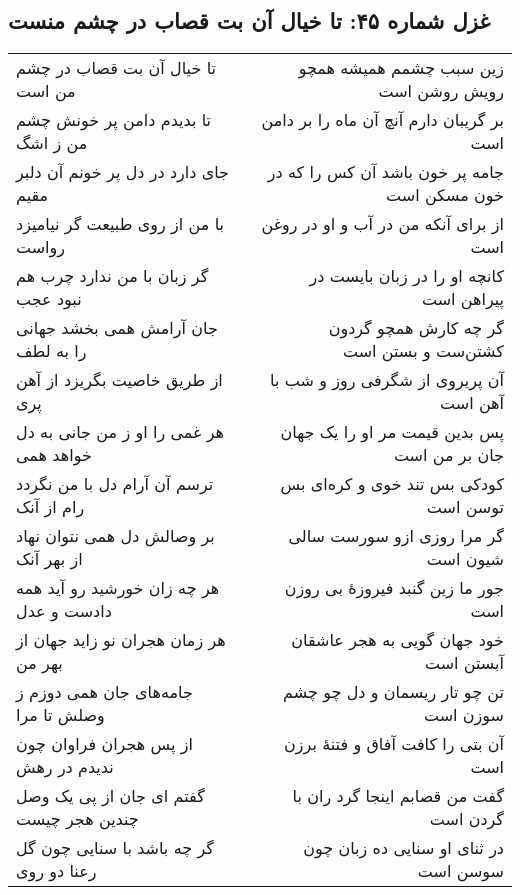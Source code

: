 \begin{center}
\section*{غزل شماره ۴۵: تا خیال آن بت قصاب در چشم منست}
\label{sec:045}
\begin{longtable}{l p{0.5cm} r}
تا خیال آن بت قصاب در چشم من است
&&
زین سبب چشمم همیشه همچو رویش روشن است
\\
تا بدیدم دامن پر خونش چشم من ز اشگ
&&
بر گریبان دارم آنچ آن ماه را بر دامن است
\\
جای دارد در دل پر خونم آن دلبر مقیم
&&
جامه پر خون باشد آن کس را که در خون مسکن است
\\
با من از روی طبیعت گر نیامیزد رواست
&&
از برای آنکه من در آب و او در روغن است
\\
گر زبان با من ندارد چرب هم نبود عجب
&&
کانچه او را در زبان بایست در پیراهن است
\\
جان آرامش همی بخشد جهانی را به لطف
&&
گر چه کارش همچو گردون کشتن‌ست و بستن است
\\
از طریق خاصیت بگریزد از آهن پری
&&
آن پریروی از شگرفی روز و شب با آهن است
\\
هر غمی را او ز من جانی به دل خواهد همی
&&
پس بدین قیمت مر او را یک جهان جان بر من است
\\
ترسم آن آرام دل با من نگردد رام از آنک
&&
کودکی بس تند خوی و کره‌ای بس توسن است
\\
بر وصالش دل همی نتوان نهاد از بهر آنک
&&
گر مرا روزی ازو سورست سالی شیون است
\\
هر چه زان خورشید رو آید همه دادست و عدل
&&
جور ما زین گنبد فیروزهٔ بی روزن است
\\
هر زمان هجران نو زاید جهان از بهر من
&&
خود جهان گویی به هجر عاشقان آبستن است
\\
جامه‌های جان همی دوزم ز وصلش تا مرا
&&
تن چو تار ریسمان و دل چو چشم سوزن است
\\
از پس هجران فراوان چون ندیدم در رهش
&&
آن بتی را کافت آفاق و فتنهٔ برزن است
\\
گفتم ای جان از پی یک وصل چندین هجر چیست
&&
گفت من قصابم اینجا گرد ران با گردن است
\\
گر چه باشد با سنایی چون گل رعنا دو روی
&&
در ثنای او سنایی ده زبان چون سوسن است
\\
\end{longtable}
\end{center}
